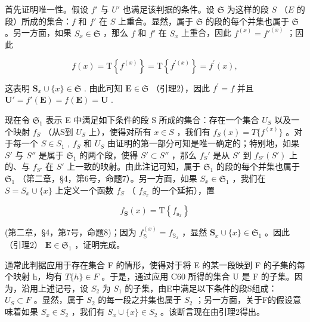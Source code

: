 首先证明唯一性。假设 \(f'\) 与 \(U'\) 也满足该判据的条件。设 \(\mathfrak{S}\) 为这样的段 \(S\) （\(E\) 的段）所成的集合：\(f\) 和 \(f'\) 在 \(S\) 上重合。显然，属于 \(\mathfrak{S}\) 的段的每个并集也属于 \(\mathfrak{S}\) 。另一方面，如果 \(S_x \in \mathfrak{S}\) ，那么 \(f\) 和 \(f'\) 在 \(S_x\) 上重合，因此 \(f^{(x)} = f'^{(x)}\) ；因此

\[
f (x) = \mathrm{T} \left\{f ^ {(x)} \right\} = \mathrm{T} \left\{f ^ {\prime (x)} \right\} = f ^ {\prime} (x),
\]

这表明 \(\mathbf{S}_x\cup \{x\} \in \mathfrak{S}\) . 由此可知 \(\mathbf{E}\in \mathfrak{S}\) （引理2），因此 \(f^{\prime} = f\) 并且 \(\mathbf{U}' = f'(\mathbf{E}) = f(\mathbf{E}) = \mathbf{U}\) .

现在令 \(\mathfrak{S}_1\) 表示 E 中满足如下条件的段 S 所成的集合：存在一个集合 \(U_S\) 以及一个映射 \(f_S\) （从S到 \(U_S\) 上），使得对所有 \(x \in S\) ，我们有 \(f_S(x) = T \{ f^{(x)} \}\) 。对于每一个 \(S \in S_1\) , \(f_S\) 和 \(U_S\) 由证明的第一部分可知是唯一确定的；特别地，如果 \(S'\) 与 \(S''\) 是属于 \(\mathfrak{S}_1\) 的两个段，使得 \(S' \subset S''\) ，那么 \(f_S'\) 是从 \(S'\) 到 \(f_{S'}(S')\) 上的、与 \(f_{S'}\) 在 \(S'\) 上一致的映射。由此注记可知，属于 \(\mathfrak{S}_1\) 的段的每个并集也属于 \(\mathfrak{S}_1\) （第二章，§4，第6号，命题7）。另一方面，如果 \(S_x \in \mathfrak{S}_1\) ，我们在 \(S = S_x \cup \{x\}\) 上定义一个函数 \(f_S\) （ \(f_{S_x}\) 的一个延拓），置

\[
f _ {\mathbf {S}} (x) = \mathrm{T} \left\{f _ {\mathbf {s} _ {x}} \right\}
\]

(第二章，§4，第7号，命题8)；因为 \(f_{\mathbb{S}}^{(x)} = f_{\mathbb{S}_x}\) ，显然 \(\mathbf{S}_x \cup \{x\} \in \mathfrak{S}_1\) 。因此（引理2） \(\mathbf{E} \in \mathfrak{S}_1\) ，证明完成。

通常此判据应用于存在集合 F 的情形，使得对于将 E 的某一段映到 F 的子集的每个映射 h，均有 \(T\{h\}\in F\) 。于是，通过应用 C60 所得的集合 U 是 F 的子集。因为，沿用上述记号，设 \(S_{2}\) 为 \(S_{1}\) 的子集，由E中满足以下条件的段S组成： \(U_{S}\subset F\) 。显然，属于 \(S_{2}\) 的每一段之并集也属于 \(S_{2}\) ；另一方面，关于F的假设意味着如果 \(S_{x}\in S_{2}\) ，我们有 \(S_{x}\cup\{x\}\in S_{2}\) 。该断言现在由引理2得出。

